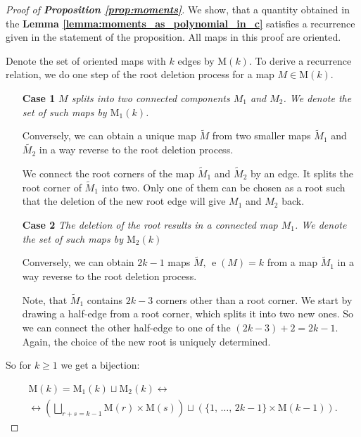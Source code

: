 \documentclass{article}
\begin{document}
\begin{proof}[Proof of \textbf{Proposition \ref{prop:moments}}]
    We show, that a quantity obtained in the \textbf{Lemma \ref{lemma:moments_as_polynomial_in_c}} satisfies a recurrence given in the statement of the proposition. All maps in this proof are oriented.
    
    Denote the set of oriented maps with $k$ edges by $\mathrm{M}(k)$. To derive a recurrence relation, we do one step of the root deletion process for a map $M \in \mathrm{M}(k)$.
    
    \begin{itemize}
    	\item[\textbf{Case 1}] \emph{$M$ splits into two connected components $M_1$ and $M_2$. We denote the set of such maps by $\mathrm{M}_{1}(k)$.}
    	
    	Conversely, we can obtain a unique map $\tilde{M}$ from two smaller maps $\tilde{M}_1$ and $\tilde{M_2}$ in a way reverse to the root deletion process.
    	
    	We connect the root corners of the map $\tilde{M}_1$ and $\tilde{M}_2$ by an edge. It splits the root corner of $\tilde{M}_1$ into two. Only one of them can be chosen as a root such that the deletion of the new root edge will give $M_1$ and $M_2$ back.
    	
    	\item[\textbf{Case 2}] \emph{The deletion of the root results in a connected map $M_1$. We denote the set of such maps by $\mathrm{M}_2(k)$}
    	
    	Conversely, we can obtain $2k - 1$ maps $\tilde{M}, \, \mathop{e}(M) = k$ from a map $\tilde{M}_1$ in a way reverse to the root deletion process.
    	
    	Note, that $\tilde{M}_1$ contains $2k - 3$ corners other than a root corner. We start by drawing a half-edge from a root corner, which splits it into two new ones. So we can connect the other half-edge to one of the $(2k - 3) + 2 = 2k - 1$. Again, the choice of the new root is uniquely determined. 
    \end{itemize}

	
    
	So for $k \geq 1$ we get a bijection:
    
    \begin{multline}\label{eq:oriented_maps_decomposition}
        \mathrm{M}(k) = \mathrm{M}_1(k) \sqcup \mathrm{M}_2(k) \longleftrightarrow \\ 
        \longleftrightarrow\left(\bigsqcup_{r + s = k - 1}\mathrm{M}(r)\times \mathrm{M}(s)\right) \sqcup \left(\{1,\,  \ldots,\, 2k - 1\} \times \mathrm{M}(k - 1)\right).
    \end{multline}


\end{proof}
\end{document}
